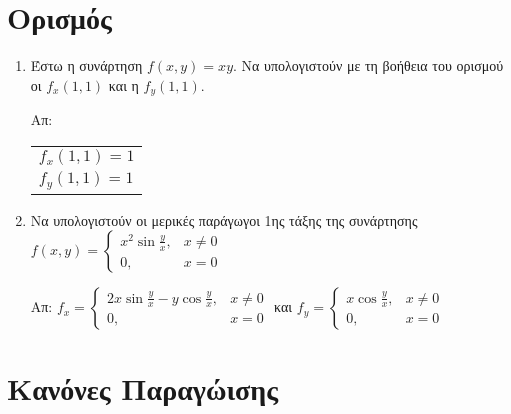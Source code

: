 







\begin{center}
    \color{Col2}
\end{center} 

\vspace{\baselineskip} 

\section{Ορισμός}

\begin{enumerate}
    \item Έστω η συνάρτηση $ f(x,y) = xy $. Να υπολογιστούν με τη 
        βοήθεια του ορισμού οι $ f_{x}(1,1) $ και η $ f_{y}(1,1) $. 

        \hfill Απ: 
        \begin{tabular}{l}
            $f_{x}(1,1) = 1$ \\
            $f_{y}(1,1) = 1$
        \end{tabular} 

    \item Να υπολογιστούν οι μερικές παράγωγοι 1ης τάξης της συνάρτησης
        $
        f(x,y) = 
        \begin{cases}
            x^{2} \sin{\frac{y}{x}}, & x \neq 0 \\
            0, & x = 0 
        \end{cases}
        $ 

        \hfill Απ: 
            $  f_{x} = 
            \begin{cases}
                2x \sin{\frac{y}{x}} - y \cos{\frac{y}{x}}, & 
                x \neq 0  \\ 
                0, & x = 0 
            \end{cases} $ \quad 
            και \quad
            $ f_{y} = 
            \begin{cases}
                x \cos{\frac{y}{x}}, & x \neq 0 \\
                0, & x = 0 
            \end{cases} $    

\end{enumerate}


\section{Κανόνες Παραγώισης}

